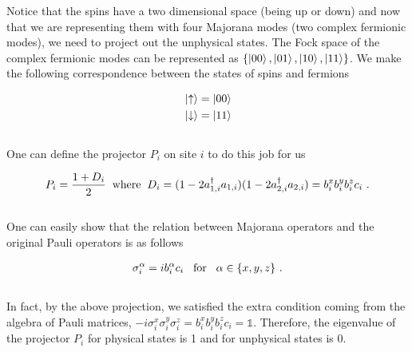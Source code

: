 \documentclass{article}
\begin{document}
Notice that the spins have a two dimensional space (being up or down) and now that we are representing them with four Majorana modes (two complex fermionic modes), we need to project out the unphysical states. The Fock space of the complex fermionic modes can be represented as $\{\ket{00}, \ket{01}, \ket{10}, \ket{11}\}$. We make the following correspondence between the states of spins and fermions 

\begin{equation}\label{eq:21}
    \begin{aligned}
        & \ket{\uparrow} = \ket{00} \\
        & \ket{\downarrow} = \ket{11}
    \end{aligned}
\end{equation}{}\\

One can define the projector $P_i$ on site $i$ \cite{Pedrocchi_2011} to do this job for us

\begin{equation}\label{eq:22}
    \begin{aligned}
        P_i = \frac{1+D_i}{2} \hspace{2mm}\text{where}\hspace{2mm} D_i = (1-2a^\dagger_{1,i}a_{1,i})(1-2a^\dagger_{2,i}a_{2,i}) = b^x_i b^y_i b^z_i c_i~.
    \end{aligned}
\end{equation}{}\\

One can easily show that the relation between Majorana operators and the original Pauli operators is as follows

\begin{equation}\label{eq:23}
    \begin{aligned}
        \sigma^\alpha_i = i b^\alpha_i c_i \hspace{3mm}\text{for}\hspace{3mm} \alpha\in \{x,y,z\}~.\\
    \end{aligned}
\end{equation}{}\\

In fact, by the above projection, we satisfied the extra condition coming from the algebra of Pauli matrices, $-i\sigma^x_i\sigma^y_i\sigma^z_i = b^x_i b^y_i b^z_i c_i = \mathbb{1}$. Therefore, the eigenvalue of the projector $P_i$ for physical states is 1 and for unphysical states is 0.
\end{document}
